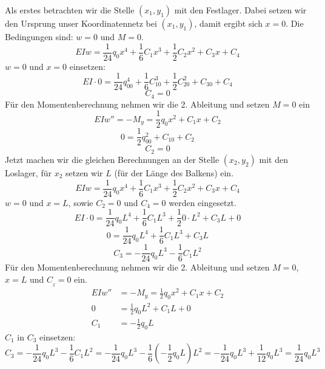 Als erstes betrachten wir die Stelle $(x_1, y_1)$ mit den Festlager.
Dabei setzen wir den Ursprung unser Koordinatennetz bei $(x_1, y_1)$, damit ergibt sich $x = 0$.
Die Bedingungen sind: $w = 0$ und $M = 0$.
\begin{equation}
	EIw=
	\frac{1}{24}q_0x^4+\frac{1}{6}C_1x^3+\frac{1}{2}C_2x^2+C_3x+C_4
\end{equation}
$w = 0$ und $x = 0$ einsetzen:
\begin{equation}
	EI\cdot0=
	\frac{1}{24}q_00^4+\frac{1}{6}C_10^3+\frac{1}{2}C_20^2+C_30+C_4
\end{equation}
\begin{equation}
	C_4=
	0
\end{equation}
Für den Momentenberechnung nehmen wir die 2. Ableitung und setzen $M = 0$ ein
\begin{equation}
	EIw''=
	-M_y=
	\frac{1}{2}q_0x^2+C_1x+C_2
\end{equation}
\begin{equation}
	0=
	\frac{1}{2}q_00^2+C_10+C_2
\end{equation}
\begin{equation}
	C_2=
	0
\end{equation}
Jetzt machen wir die gleichen Berechnungen an der Stelle $(x_2, y_2)$ mit den Loslager, für $x_2$ setzen wir $L$ (für der Länge des Balkens) ein.
\begin{equation}
	EIw=
	\frac{1}{24}q_0x^4+\frac{1}{6}C_1x^3+\frac{1}{2}C_2x^2+C_3x+C_4
\end{equation}
$w = 0$ und $x = L$, sowie $C_2 = 0$ und $C_4 = 0$ werden eingesetzt.
\begin{equation}
	EI\cdot0=
	\frac{1}{24}q_0L^4+\frac{1}{6}C_1L^3+\frac{1}{2}0\cdot L^2+C_3L+0
\end{equation}
\begin{equation}
	0=
	\frac{1}{24}q_0L^4+\frac{1}{6}C_1L^3+C_3L
\end{equation}
\begin{equation}
	C_3=
	-\frac{1}{24}q_0L^3-\frac{1}{6}C_1L^2
\end{equation}
Für den Momentenberechnung nehmen wir die 2. Ableitung und setzen $M = 0$, $x = L$ und $C__2 = 0$ ein.
\begin{align}
		EIw''&=
		-M_y=\frac{1}{2}q_0x^2+C_1x+C_2
    \\
		0 &=
		\frac{1}{2}q_0L^2+C_1L+0
    \\
		C_1&=
		-\frac{1}{2}q_0L
\end{align}
$C_1$ in $C_3$ einsetzen:
\begin{equation}
	C_3=
	-\frac{1}{24}q_0L^3-\frac{1}{6}C_1L^2
	=	-\frac{1}{24}q_0L^3-\frac{1}{6}\left(-\frac{1}{2}q_0L\right)L^2
	=	-\frac{1}{24}q_0L^3+\frac{1}{12}q_0L^3
	=	\frac{1}{24}q_0L^3
\end{equation}
